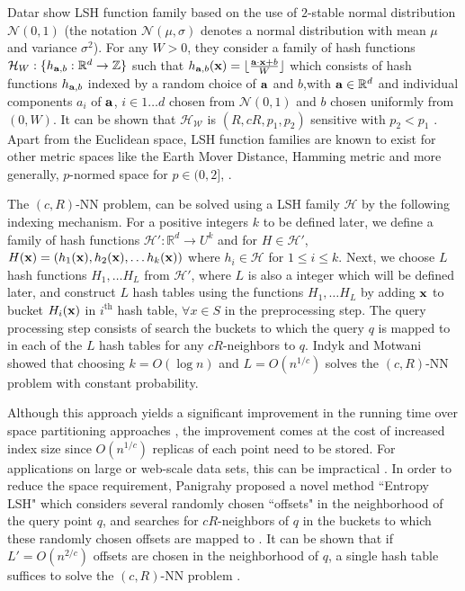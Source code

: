 \documentclass{acm_proc_article-sp}
\numberwithin{equation}{section}
\numberwithin{figure}{section}
\begin{document}
{Datar \etal show LSH function family based on the use of $2$-stable normal distribution $\mathcal{N}(0,1)$ (the notation $\mathcal{N}(\mu,\sigma)$ denotes a normal distribution with mean $\mu$ and variance $\sigma^2$). For any $W > 0$, they consider a family of hash functions $\mathcal{H}_W:\{h_{{\bf a},b}: \mathbb{R}^d \to \mathbb{Z} \}$ such that $h_{{\bf a},b}({\bf x}) = \lfloor \frac{{\bf a} \cdot {\bf x}+b}{W}\rfloor $ which consists of hash functions $h_{{\bf a},b}$ indexed by a random choice of ${\bf a}$ and $b$,with ${\bf a} \in \mathbb{R}^d$ and individual components $a_i$ of ${\bf a}$, $i \in 1 \ldots d$ chosen from $\mathcal{N}(0,1)$ and $b$ chosen uniformly from $(0,W)$. It can be shown that $\mathcal{H_W}$ is $(R,cR,p_1,p_2)$ sensitive with $p_2 < p_1$ \cite{DIIM04}. Apart from the Euclidean space, LSH function families are known to exist for other metric spaces like the Earth Mover Distance, Hamming metric and more generally, $p$-normed space for $p \in (0,2]$, \cite{C02, DIIM04}.


The $(c,R)$-NN problem, can be solved using a LSH family $\mathcal{H}$ by the following indexing mechanism. For a positive integers $k$ to be defined later, we define a family of hash functions $\mathcal{H'}: \mathbb{R}^d \to U^k$ and for $H \in \mathcal{H'}$, $H({\bf x}) = (h_1({\bf x}), h_2({\bf x}), \ldots h_k({\bf x}))$ where $h_i \in \mathcal{H}$ for $1 \leq i \leq k$.  Next, 
we choose $L$ hash functions $H_1, \ldots H_L$ from $\mathcal{H'}$, where $L$ is also a integer which will be defined later, and construct $L$ hash tables using the functions $H_1, \ldots H_L$ by adding ${\bf x}$ to bucket $H_i({\bf x})$ in $i^{\text{th}}$ hash table, $\forall x \in S$ in the preprocessing step. The query processing step consists of search the buckets to which the query $q$ is  mapped to in each of the $L$ hash tables for any $cR$-neighbors to $q$. Indyk and Motwani showed that choosing $k = O(\log{n})$ and $L = O(n^{1/c})$ solves the $(c,R)$-NN problem with constant probability. 


Although this approach yields a significant improvement in the running time over space partitioning approaches \cite{gim99}, the improvement comes at the cost of increased index size since $O(n^{1/c})$ replicas of each point need to be stored. For applications on large or web-scale data sets, this can be impractical \cite{Charikar:multiprobe, P06}. In order to reduce the space requirement, Panigrahy proposed a novel method ``Entropy LSH" which considers several randomly chosen ``offsets" in the neighborhood of the query point $q$, and searches for $cR$-neighbors of $q$ in the buckets to which these randomly chosen offsets are mapped to \cite{P06}. It can be shown that if $L' = O(n^{2/c})$ offsets are chosen in the neighborhood of $q$, a single hash table suffices to solve the $(c,R)$-NN problem \cite{P06}.

}
\end{document}
